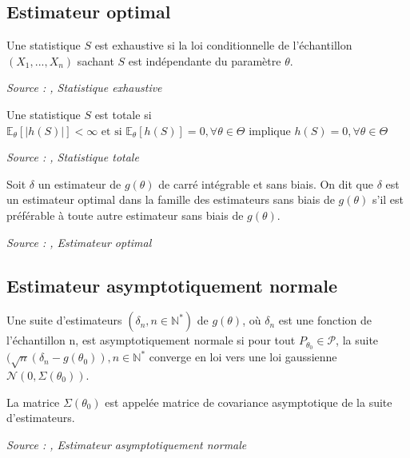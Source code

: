 \subsection{Estimateur optimal}

\begin{definition}\label{def:stat_exhaustive}
Une statistique $S$ est exhaustive si la loi conditionnelle de l'échantillon $(X_1, ..., X_n)$ sachant $S$ est indépendante du paramètre $\theta$.

\noindent\textit{Source : \cite{ensta_cours},  Statistique exhaustive}
\end{definition}

\begin{definition}\label{statistique totale}
Une statistique $S$ est totale si $\mathbb{E}_\theta[|h(S)|] < \infty \text{ et si } \mathbb{E}_\theta[h(S)] = 0, \forall \theta \in \Theta \text{ implique } h(S) = 0, \forall \theta \in \Theta$

\noindent\textit{Source : \cite{ensta_cours},  Statistique totale}
\end{definition}

\begin{definition}\label{def:estimateur_optimal}
Soit $\delta$ un estimateur de $g(\theta)$ de carré intégrable et sans biais. On dit que $\delta$ est un estimateur optimal dans la famille des estimateurs sans biais de $g(\theta)$ s'il est préférable à toute autre estimateur sans biais de $g(\theta)$.

\noindent\textit{Source : \cite{ensta_cours},  Estimateur optimal}
\end{definition}


\subsection{Estimateur asymptotiquement normale}

\begin{definition}\label{def:asymptotiquement_normale}
Une suite d'estimateurs $(\delta_n, n \in \mathbb{N}^*)$ de $g(\theta)$, où $\delta_n$ est une fonction de l'échantillon n, est asymptotiquement normale si pour tout $P_{\theta_0} \in \mathcal{P}$, la suite $(\sqrt{n}(\delta_n - g(\theta_0)), n \in \mathbb{N}^*$ converge en loi vers une loi gaussienne $\mathcal{N}(0, \Sigma(\theta_0))$.

La matrice $\Sigma(\theta_0)$ est appelée matrice de covariance asymptotique de la suite d'estimateurs.

\noindent\textit{Source : \cite{ensta_cours},  Estimateur asymptotiquement normale}
\end{definition}

